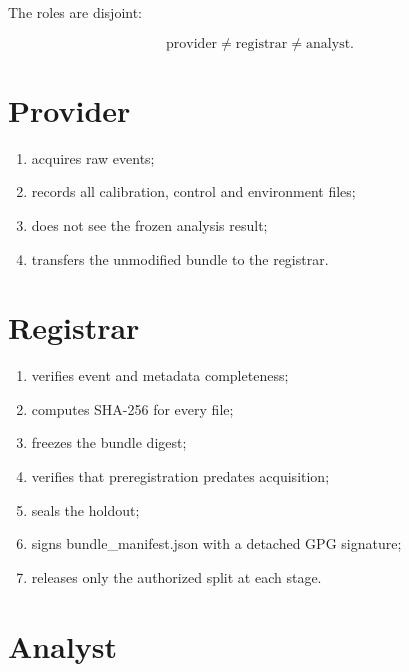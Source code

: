 \documentclass[11pt,a4paper,openany]{report}
\begin{document}
The roles are disjoint:

\[
\mathrm{provider}\neq\mathrm{registrar}\neq\mathrm{analyst}.
\]

\section{Provider}

\begin{enumerate}
\item 
acquires raw events;

\item 
records all calibration, control and environment files;

\item 
does not see the frozen analysis result;

\item 
transfers the unmodified bundle to the registrar.

\end{enumerate}

\section{Registrar}

\begin{enumerate}
\item 
verifies event and metadata completeness;

\item 
computes SHA-256 for every file;

\item 
freezes the bundle digest;

\item 
verifies that preregistration predates acquisition;

\item 
seals the holdout;

\item 
signs bundle\_manifest.json with a detached GPG signature;

\item 
releases only the authorized split at each stage.

\end{enumerate}

\section{Analyst}
\end{document}
